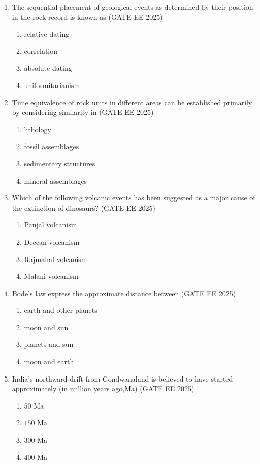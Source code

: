 \documentclass[journal]{IEEEtran}
\begin{document}
\begin{enumerate}[start=1]
\item  The sequential placement of geological events as determined by their position in the rock record is known as
\hfill{(GATE EE 2025)}
\begin{enumerate}
\item relative dating
\item correlation
\item absolute dating
\item uniformitarianism
\end{enumerate}


\item  Time equivalence of rock units in different areas  can be established primarily by considering similarity in
\hfill{(GATE EE 2025)}
\begin{enumerate}
\item lithology
\item fossil assemblages
\item sedimentary structures
\item mineral assemblages
\end{enumerate}

\item  Which of the following volcanic events has been suggested as a major cause of the extinction of dinosaurs?
\hfill{(GATE EE 2025)}
\begin{enumerate}
\item Panjal volcanism
\item Deccan volcanism
\item Rajmahal volcanism
\item Malani volcanism
\end{enumerate}


\item Bode's law express the approximate distance between
\hfill{(GATE EE 2025)}
\begin{enumerate}
\item earth and other planets
\item moon and sun
\item planets and sun
\item moon and earth
\end{enumerate}

\item  India's northward drift from Gondwanaland is believed to have started approximately (in million years ago,Ma)
\hfill{(GATE EE 2025)}
\begin{enumerate}
\item $50$ Ma
\item $150$ Ma
\item $300$ Ma
\item $400$ Ma
\end{enumerate}



\end{enumerate}
\end{document}

